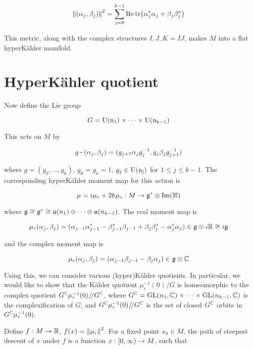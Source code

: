 \documentclass{report}
\newcommand{\sslash}{/\!/}
\begin{document}
\[\norm{(\alpha_j, \beta_j)}^2 = \sum_{j=0}^{k-1}\Re\tr(\alpha_j^*\alpha_j + \beta_j\beta_j^*)\]

This metric, along with the complex structures \(I, J, K = IJ\), makes \(M\) into a flat hyperK\"ahler manifold.

\section{HyperK\"ahler quotient}

\label{sec:hyperkahler-quotient}

Now define the Lie group

\[G = \rm U(n_1) \times \cdots \times \rm U(n_{k-1})\]

This acts on \(M\) by

\begin{equation}
    \label{eq:ks-action}
    g \vdot (\alpha_j, \beta_j) = (g_{j+1}\alpha_jg_j^{-1}, g_j\beta_jg_{j+1}^{-1})
\end{equation}

where \(g = (g_0, \dots, g_k)\), \(g_0 = g_k = 1\), \(g_j \in \rm U(n_j)\) for \(1 \le j \le k-1\). The corresponding hyperK\"ahler moment map for this action is

\[\mu = i\mu_r + 2k\mu_c : M \to \mathfrak{g}^* \otimes \Im(\mathbb{H})\]

where \(\mathfrak{g} \cong \mathfrak{g}^* \cong \mathfrak{u}(n_1) \oplus \cdots \oplus \mathfrak{u}(n_{k-1})\). The real moment map is

\[\mu_r(\alpha_j, \beta_j) = (\alpha_{j-1}\alpha_{j-1}^* - \beta_{j-1}^*\beta_{j-1} + \beta_j\beta_j^* - \alpha_j^*\alpha_j) \in \mathfrak{g} \otimes i\mathbb{R} \cong i\mathfrak{g}\]

and the complex moment map is

\[\mu_c(\alpha_j, \beta_j) = (\alpha_{j-1}\beta_{j-1} - \beta_j\alpha_j) \in \mathfrak{g} \otimes \mathbb{C}\]

Using this, we can consider various (hyper)K\"ahler quotients. In particular, we would like to show that the K\"ahler quotient \(\mu_r^{-1}(0)/G\) is homeomorphic to the complex quotient \(G^\C\mu_r^{-1}(0)\sslash G^\C\), where \(G^{\mathbb{C}} = \operatorname{GL}(n_1, \mathbb{C}) \times \cdots \times \operatorname{GL}(n_{k-1}, \mathbb{C})\) is the complexification of \(G\), and \(G^\C\mu_r^{-1}(0)\sslash G^\C\) is the set of closed \(G^{\mathbb{C}}\) orbits in \(G^{\mathbb{C}}\mu_r^{-1}(0)\).

Define \(f : M \to \mathbb{R}\), \(f(x) = \norm{\mu_r}^2\). For a fixed point \(x_0 \in M\), the path of steepest descent of \(x\) under \(f\) is a function \(x : [0, \infty) \to M\), such that
\end{document}
